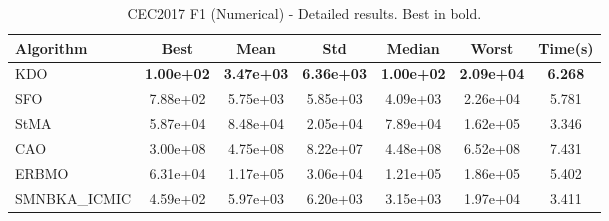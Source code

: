 \begin{table}[H]
\centering\small
\caption{CEC2017 F1 (Numerical) - Detailed results. Best in bold.}
\label{tab:cec2017_F1}
\begin{tabular}{lcccccc}
\toprule
\textbf{Algorithm} & \textbf{Best} & \textbf{Mean} & \textbf{Std} & \textbf{Median} & \textbf{Worst} & \textbf{Time(s)} \\
\midrule
KDO & \textbf{1.00e+02} & \textbf{3.47e+03} & \textbf{6.36e+03} & \textbf{1.00e+02} & \textbf{2.09e+04} & \textbf{6.268} \\
SFO & 7.88e+02 & 5.75e+03 & 5.85e+03 & 4.09e+03 & 2.26e+04 & 5.781 \\
StMA & 5.87e+04 & 8.48e+04 & 2.05e+04 & 7.89e+04 & 1.62e+05 & 3.346 \\
CAO & 3.00e+08 & 4.75e+08 & 8.22e+07 & 4.48e+08 & 6.52e+08 & 7.431 \\
ERBMO & 6.31e+04 & 1.17e+05 & 3.06e+04 & 1.21e+05 & 1.86e+05 & 5.402 \\
SMNBKA_ICMIC & 4.59e+02 & 5.97e+03 & 6.20e+03 & 3.15e+03 & 1.97e+04 & 3.411 \\
\bottomrule
\end{tabular}
\end{table}
